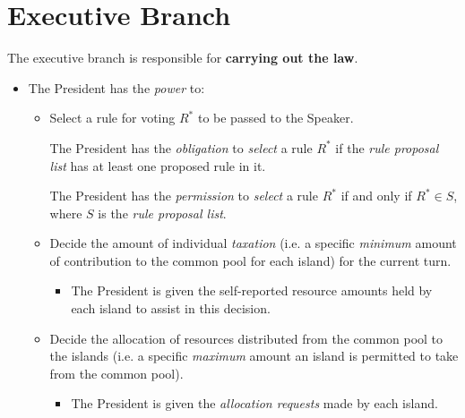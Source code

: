 \section{Executive Branch}
\label{sec:executive}
The executive branch is responsible for \textbf{carrying out the law}.
\begin{itemize}
       
    \item The President has the \emph{power} to: 
    \begin{itemize}
        
        \item Select a rule for voting $R^{*}$ to be passed to the Speaker.
        \begin{rule_IIGO}
            The President has the \emph{obligation} to \emph{select} a rule $R^{*}$ if the \emph{rule proposal list} has at least one proposed rule in it.
        \end{rule_IIGO}
        \begin{rule_IIGO}
            The President has the \emph{permission} to \emph{select} a rule $R^{*}$ if and only if $R^{*} \in S$, where $S$ is the \emph{rule proposal list}.
        \end{rule_IIGO}
        
        \item Decide the amount of individual \emph{taxation} (i.e. a specific \emph{minimum} amount of contribution to the common pool for each island) for the current turn.
        
        \begin{itemize}
            \item The President is given the self-reported resource amounts held by each island to assist in this decision.
        \end{itemize}
        
        \item Decide the allocation of resources distributed from the common pool to the islands (i.e. a specific \emph{maximum} amount an island is permitted to take from the common pool).
        
        \begin{itemize}
            \item The President is given the \emph{allocation requests} made by each island.
        \end{itemize}
    \end{itemize}
\end{itemize}




